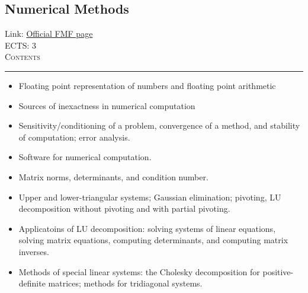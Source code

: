 \documentclass[11pt, a4paper]{article}
\newenvironment{course}[3]{
\subsection{#1}%
Link: \href{#2}{Official FMF page}\\%
ECTS: #3%
\vspace{1ex}
\\
{\large \textsc{Contents}}\\[-0.9ex]%
\rule{\textwidth}{0.5pt}
\vspace{-3ex}
}
{}
\newenvironment{chapter}[1]{
\begin{tcolorbox}[title=#1, breakable]
}
{\end{tcolorbox}}
\begin{document}
\begin{course}{Numerical Methods}{https://www.fmf.uni-lj.si/en/study-physics/programmes/1fiz/2020/7000777/courses/524/}{3}
    \label{numerical-methods}

    \begin{chapter}{Introduction to numerical computation}
        \begin{itemize}

            \item Floating point representation of numbers and floating point arithmetic

            \item Sources of inexactness in numerical computation

            \item Sensitivity/conditioning of a problem, convergence of a method, and stability of computation; error analysis.

            \item Software for numerical computation.
            
        \end{itemize}
    \end{chapter}

    \begin{chapter}{Systems of linear equation}
        \begin{itemize}
            
            \item Matrix norms, determinants, and condition number.

            \item Upper and lower-triangular systems; Gaussian elimination; pivoting, LU decomposition without pivoting and with partial pivoting.

            \item Applicatoins of LU decomposition: solving systems of linear equations, solving matrix equations, computing determinants, and computing matrix inverses.

            \item Methods of special linear systems: the Cholesky decomposition for positive-definite matrices; methods for tridiagonal systems.

            
        \end{itemize}
    \end{chapter}

    \begin{chapter}{Nonlinear equations}
        \begin{itemize}
        

\end{itemize}
\end{chapter}
\end{course}
\end{document}
